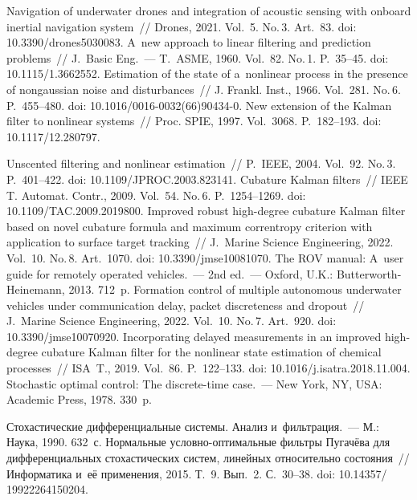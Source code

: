 \begin{multicols}{2}
{{\begin{thebibliography}{99}
 Navigation of underwater drones and integration of 
acoustic sensing with onboard inertial navigation system~// Drones, 2021. Vol.~5. No.\,3. 
Art.~83. doi: 10.3390/drones5030083.
 A~new approach to linear filtering and prediction problems~// J.~Basic Eng.~--- T.~ASME, 1960. Vol.~82. No.\,1. P.~35--45. 
      doi: 10.1115/1.3662552.
 Estimation of the state of a~nonlinear process in the presence of 
nongaussian noise and disturbances~// J. Frankl. Inst., 1966. Vol.~281. No.\,6. P.~455--480.
      doi: 10.1016/0016-0032(66)90434-0.
 New extension of the Kalman filter to nonlinear systems~// 
Proc. SPIE, 1997. Vol.~3068. P.~182--193. doi: 10.1117/12.280797.

       Unscented filtering and nonlinear estimation~// P.~IEEE, 2004. Vol.~92. No.\,3. P.~401--422. doi: 10.1109/JPROC.2003.823141.
       Cubature Kalman filters~// IEEE T. Automat. Contr., 
2009. Vol.~54. No.\,6. P.~1254--1269. doi: 10.1109/TAC.2009.2019800.
 Improved robust high-degree cubature Kalman filter based on 
novel cubature formula and maximum correntropy criterion with application to surface target 
tracking~// J.~Marine Science Engineering,  2022. Vol.~10. No.\,8. Art.~1070. doi: 10.3390/jmse10081070.
 The ROV manual: A~user guide for remotely operated 
vehicles.~--- 2nd ed.~--- Oxford, U.K.: Butterworth-Heinemann, 2013. 712~p.
 Formation control of multiple 
autonomous underwater vehicles under communication delay, packet discreteness and dropout~// 
J.~Marine Science Engineering, 2022. Vol.~10. No.\,7. Art.~920. doi: 10.3390/jmse10070920.
 Incorporating delayed measurements in an 
improved high-degree cubature Kalman filter for the nonlinear state estimation of chemical 
processes~// ISA~T., 2019. Vol.~86. P.~122--133. doi: 10.1016/j.isatra.2018.11.004.
 Stochastic optimal control: The discrete-time case.~--- New 
York, NY, USA: Academic Press, 1978. 330~p.

\columnbreak


 Стохастические дифференциальные системы. Анализ 
и~фильт\-ра\-ция.~---  М.: Наука, 1990. 632~с.
 Нормальные услов\-но-оп\-ти\-маль\-ные  
фильт\-ры Пугачёва для дифференциальных стохастических сис\-тем, линейных 
относительно со\-сто\-яния~// Информатика и~её \mbox{применения}, 2015. Т.~9. Вып.~2. С.~30--38. 
doi: 10.14357/ 19922264150204.
\end{thebibliography}

 }
 }

\end{multicols}

